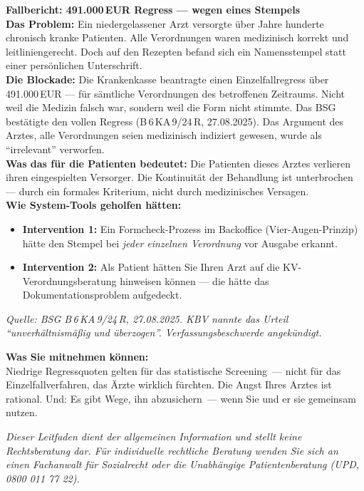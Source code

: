 \documentclass[a4paper]{umbruch-position}
\begin{document}
\begin{infobox}
\textbf{Fallbericht: 491.000\,EUR Regress --- wegen eines Stempels}\\
\textbf{Das Problem:} Ein niedergelassener Arzt versorgte \"uber Jahre hunderte chronisch kranke Patienten. Alle Verordnungen waren medizinisch korrekt und leitliniengerecht. Doch auf den Rezepten befand sich ein Namensstempel statt einer pers\"onlichen Unterschrift.\\[4pt]
\textbf{Die Blockade:} Die Krankenkasse beantragte einen Einzelfallregress \"uber 491.000\,EUR --- f\"ur s\"amtliche Verordnungen des betroffenen Zeitraums. Nicht weil die Medizin falsch war, sondern weil die Form nicht stimmte. Das BSG best\"atigte den vollen Regress (B\,6\,KA\,9/24\,R, 27.08.2025). Das Argument des Arztes, alle Verordnungen seien medizinisch indiziert gewesen, wurde als ``irrelevant'' verworfen.\\[4pt]
\textbf{Was das f\"ur die Patienten bedeutet:} Die Patienten dieses Arztes verlieren ihren eingespielten Versorger. Die Kontinuit\"at der Behandlung ist unterbrochen --- durch ein formales Kriterium, nicht durch medizinisches Versagen.\\[4pt]
\textbf{Wie System-Tools geholfen h\"atten:}
\begin{itemize}[nosep]
  \item \textbf{Intervention 1:} Ein Formcheck-Prozess im Backoffice (Vier-Augen-Prinzip) h\"atte den Stempel bei \textit{jeder einzelnen Verordnung} vor Ausgabe erkannt.
  \item \textbf{Intervention 2:} Als Patient h\"atten Sie Ihren Arzt auf die KV-Verordnungsberatung hinweisen k\"onnen --- die h\"atte das Dokumentationsproblem aufgedeckt.
\end{itemize}
\textit{Quelle: BSG B\,6\,KA\,9/24\,R, 27.08.2025. KBV nannte das Urteil ``unverh\"altnism\"a\ss{}ig und \"uberzogen''. Verfassungsbeschwerde angek\"undigt.}
\end{infobox}

\vspace{1cm}

\begin{infobox}
\textbf{Was Sie mitnehmen k\"onnen:}\\
Niedrige Regressquoten gelten f\"ur das statistische Screening~--- nicht f\"ur das Einzelfallverfahren, das \"Arzte wirklich f\"urchten. Die Angst Ihres Arztes ist rational. Und: Es gibt Wege, ihn abzusichern~--- wenn Sie und er sie gemeinsam nutzen.
\end{infobox}

\vfill
\begin{center}
\footnotesize{\textit{Dieser Leitfaden dient der allgemeinen Information und stellt keine Rechtsberatung dar. F\"ur individuelle rechtliche Beratung wenden Sie sich an einen Fachanwalt f\"ur Sozialrecht oder die Unabh\"angige Patientenberatung (UPD, 0800 011 77 22).}}
\end{center}
\end{document}
